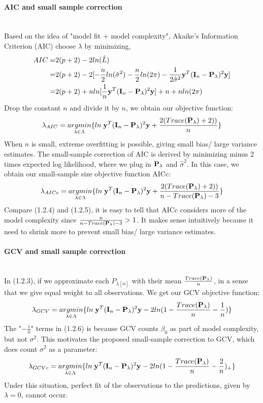 \documentclass[11pt]{article}
\begin{document}
\paragraph{AIC and small sample correction}\mbox{}\\
Based on the idea of "model fit + model complexity", Akaike's Information Criterion (AIC) choose $\lambda$ by minimizing,
\begin{align*}
AIC=&2(p+2)-2ln(\hat{L})\\
=&2(p+2)-2[-\frac{n}{2}ln (\hat{\sigma}^2)-\frac{n}{2}ln (2\pi)-\frac{1}{2\hat{\sigma}^2}{\bf y}^T({\bf I}_n-{\bf P}_\lambda)^2{\bf y}]\\
=&2(p+2)+n ln[\frac{1}{n}{\bf y}^T({\bf I}_n-{\bf P}_\lambda)^2{\bf y}]+n+n ln(2\pi)
\end{align*}
Drop the constant $n$ and divide it by $n$, we obtain our objective function:
\begin{align}
\lambda_{AIC}=\underset{\lambda \in \Lambda}{argmin}\{ln\; {\bf y}^T({\bf I}_n-{\bf P}_\lambda)^2{\bf y}+\frac{2(Trace({\bf P}_\lambda)+2))}{n}\}
\end{align}
When $n$ is small, extreme overfitting is possible, giving small bias/ large variance estimates. The small-sample correction of AIC is derived by minimizing minus 2 times expected log likelihood, where we plug in ${\bf P}_\lambda$ and $\hat{\sigma}^2$. In this case, we obtain our small-sample size objective function AICc:
\begin{align}
\lambda_{AICc}=\underset{\lambda \in \Lambda}{argmin}\{ln\; {\bf y}^T({\bf I}_n-{\bf P}_\lambda)^2{\bf y}+\frac{2(Trace({\bf P}_\lambda)+2))}{n-Trace({\bf P}_\lambda)-3}\}
\end{align}
Compare (1.2.4) and (1.2.5), it is easy to tell that AICc considers more of the model complexity since $\frac{n}{n-Trace({\bf P}_\lambda)-3}>1$. It makes sense intuitively because it need to shrink more to prevent small bias/ large variance estimates.

\paragraph{GCV and small sample correction}\mbox{}\\
In (1.2.3), if we approximate each $P_{\lambda[ii]}$ with their mean $\frac{Trace({\bf P}_\lambda)}{n}$, in a sense that we give equal weight to all observations. We get our GCV objective function:
\begin{align}
\lambda_{GCV}=\underset{\lambda \in \Lambda}{argmin}\{ln\; {\bf y}^T({\bf I}_n-{\bf P}_\lambda)^2{\bf y}-2ln(1-\frac{Trace({\bf P}_\lambda)}{n}-\frac{1}{n})\}
\end{align}
The "$-\frac{1}{n}$" terms in (1.2.6) is because GCV counts $\beta_0$ as part of model complexity, but not $\sigma^2$. This motivates the proposed small-sample correction to GCV, which does count $\sigma^2$ as a parameter:
\begin{align}
\lambda_{GCVc}=\underset{\lambda \in \Lambda}{argmin}\{ln\; {\bf y}^T({\bf I}_n-{\bf P}_\lambda)^2{\bf y}-2ln(1-\frac{Trace({\bf P}_\lambda)}{n}-\frac{2}{n})_+\}
\end{align}
Under this situation, perfect fit of the observations to the predictions, given by $\lambda=0$, cannot occur.
\end{document}
